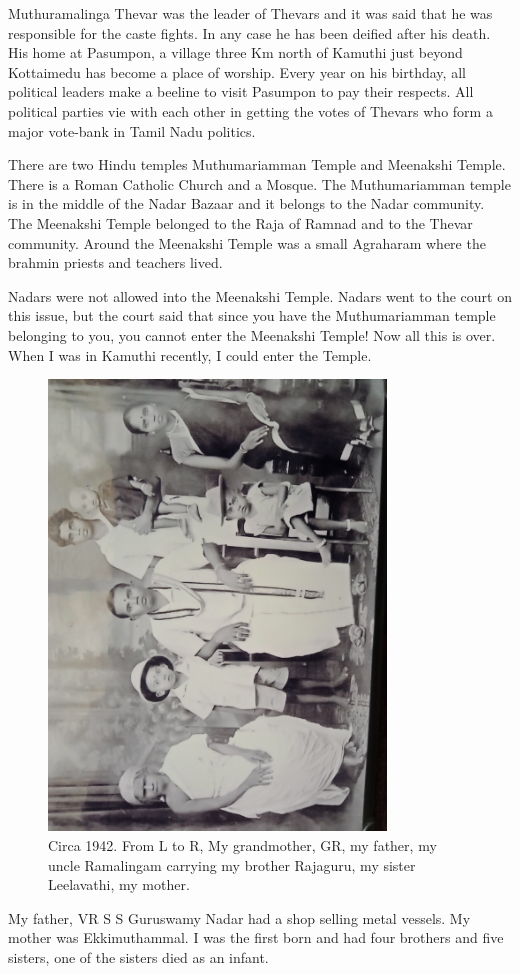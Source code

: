 Muthuramalinga Thevar was the leader of Thevars and it was said that he 
was responsible for the caste fights. In any case he has been deified 
after his death. His home at Pasumpon, a village three Km north of 
Kamuthi just beyond Kottaimedu has become a place of worship. Every year 
on his birthday, all political leaders make a beeline to visit Pasumpon 
to pay their respects. All political parties vie with each other in 
getting the votes of Thevars who form a major vote-bank in Tamil Nadu 
politics.
 
There are two Hindu temples Muthumariamman Temple and Meenakshi Temple. 
There is a Roman Catholic Church and a Mosque. The Muthumariamman temple 
is in the middle of the Nadar Bazaar and it belongs to the Nadar 
community. The Meenakshi Temple belonged to the Raja of Ramnad and to 
the Thevar community. Around the Meenakshi Temple was a small Agraharam 
where the brahmin priests and teachers lived.

Nadars were not allowed into the Meenakshi Temple. Nadars went to the 
court on this issue, but the court said that since you have the 
Muthumariamman temple belonging to you, you cannot enter the Meenakshi 
Temple! Now all this is over. When I was in Kamuthi recently, I could 
enter the Temple.
\begin{figure}[h]
\centering 
\includegraphics[angle=270,width=0.8\textwidth]{images/Rajaji-01.jpg}
\caption{Circa 1942. From L to R, My grandmother, GR, my father,
my uncle Ramalingam carrying my brother Rajaguru, my sister
Leelavathi, my mother.}
\end{figure}
My father, VR S S Guruswamy Nadar had a shop selling metal vessels. My 
mother was Ekkimuthammal. I was the first born and had four brothers and 
five sisters, one of the sisters died as an infant.

